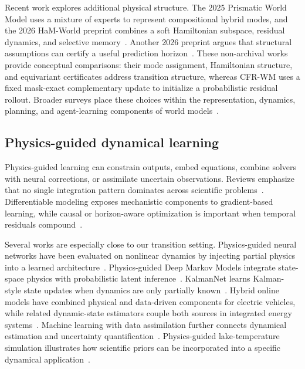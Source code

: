 Recent work explores additional physical structure. The 2025 Prismatic World Model uses a mixture of experts to represent compositional hybrid modes, and the 2026 HaM-World preprint combines a soft Hamiltonian subspace, residual dynamics, and selective memory~\cite{mingwei2025_prismatic_world_model_learning_compositional,tang2026_ham_world_soft_hamiltonian_world}. Another 2026 preprint argues that structural assumptions can certify a useful prediction horizon~\cite{wang2026_scale_buys_interpolation_structure_buys}. These non-archival works provide conceptual comparisons: their mode assignment, Hamiltonian structure, and equivariant certificates address transition structure, whereas CFR-WM uses a fixed mask-exact complementary update to initialize a probabilistic residual rollout. Broader surveys place these choices within the representation, dynamics, planning, and agent-learning components of world models~\cite{ding2025_understanding_world_or_predicting_future}.

\subsection{Physics-guided dynamical learning}

Physics-guided learning can constrain outputs, embed equations, combine solvers with neural corrections, or assimilate uncertain observations. Reviews emphasize that no single integration pattern dominates across scientific problems~\cite{cuomo2022_scientific_machine_learning_through_physics,bradley2022_perspectives_on_the_integration_between,yu2024_learning_dynamical_systems_from_data}. Differentiable modeling exposes mechanistic components to gradient-based learning, while causal or horizon-aware optimization is important when temporal residuals compound~\cite{shen2023_differentiable_modelling_to_unify_machine,wang2024_respecting_causality_for_training_physics,list2022_learned_turbulence_modelling_with_differentiable}.

Several works are especially close to our transition setting. Physics-guided neural networks have been evaluated on nonlinear dynamics by injecting partial physics into a learned architecture~\cite{robinson2022_physics_guided_neural_networks_for}. Physics-guided Deep Markov Models integrate state-space physics with probabilistic latent inference~\cite{liu2022_physics_guided_deep_markov_models}. KalmanNet learns Kalman-style state updates when dynamics are only partially known~\cite{revach2022_kalmannet}. Hybrid online models have combined physical and data-driven components for electric vehicles, while related dynamic-state estimators couple both sources in integrated energy systems~\cite{chen2022_hybrid_physics_data_driven_online,chen2023_hybrid_physics_and_data_driven}. Machine learning with data assimilation further connects dynamical estimation and uncertainty quantification~\cite{cheng2023_machine_learning_with_data_assimilation}. Physics-guided lake-temperature simulation illustrates how scientific priors can be incorporated into a specific dynamical application~\cite{jia2021_physics_guided_machine_learning_for}.

